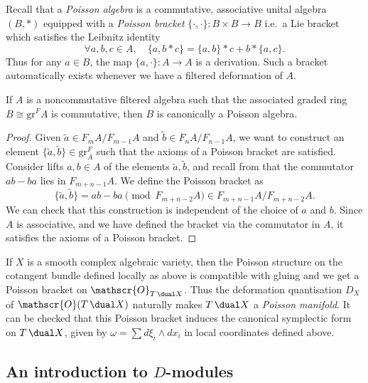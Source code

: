 Recall that a \emph{Poisson algebra} is a commutative, associative unital
algebra $(B, *)$ equipped with a \emph{Poisson bracket} $\{\cdot,\cdot\}:
B\times B\to B$ i.e.\ a Lie bracket which satisfies the Leibnitz identity 
\begin{equation*} 
    \forall a,b,c\in A, \quad \{a,b*c\}=\{a,b\}*c + b*\{a,c\}.
\end{equation*}
Thus for any \(a\in B\), the map \(\{a,\cdot\}:A\to A\) is a derivation. Such a
bracket automatically exists whenever we have a filtered deformation of \(A\).

\begin{proposition}\label{prop:Poisson} 
    If $A$ is a noncommutative filtered algebra such that the associated graded
    ring $B\cong \text{gr}^F A$ is commutative, then $B$ is canonically a
    Poisson algebra.    
    \begin{proof} 
        Given $\tilde{a}\in F_m A / F_{m-1} A$ and $\tilde{b} \in F_n A /
        F_{n-1} A$, we want to construct an element $\{\tilde{a},\tilde{b}\}\in
        \text{gr}^F_A$ such that the axioms of a Poisson bracket are satisfied.
        Consider lifts $a, b \in A$ of the elements $\tilde{a}, \tilde{b}$, and
        recall from  that the commutator $ab-ba$ lies in
        $F_{m+n-1} A$. We define the Poisson bracket as
        \[\{\tilde{a},\tilde{b}\} = ab-ba \pmod{F_{m+n-2}A}\in F_{m+n-1} A /
        F_{m+n-2} A.\] We can check that this construction is independent of the
        choice of $a$ and $b$. Since $A$ is associative, and we have defined the
        bracket via the commutator in $A$, it satisfies the axioms of a Poisson
        bracket.  
    \end{proof} 
\end{proposition}  

If \(X\) is a smooth complex algebraic variety, then the Poisson structure on
the cotangent bundle defined locally as above is compatible with gluing and we
get a Poisson bracket on \(\mathscr{O}_{T\,\dual X}\). Thus
the deformation quantisation $D_X$ of $\mathscr{O}(T\,\dual X)$ naturally makes
\(T\,\dual X\) a \textit{Poisson manifold}. It can be checked that this Poisson
bracket induces the canonical symplectic form on \(T\,\dual X\), given 
by \(\omega = \sum d\xi_i\wedge dx_i\) in local coordinates defined above. 

\subsection{An introduction to \texorpdfstring{$D$}{D}-modules}

